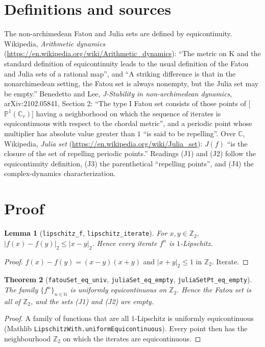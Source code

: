 \documentclass[11pt]{article}
\newtheorem{theorem}{Theorem}
\newtheorem{lemma}[theorem]{Lemma}
\theoremstyle{definition}
\newcommand{\Zt}{\mathbb{Z}_2}
\begin{document}
\section{Definitions and sources}

The non-archimedean Fatou and Julia sets are defined by equicontinuity. Wikipedia,
\emph{Arithmetic dynamics} (\url{https://en.wikipedia.org/wiki/Arithmetic_dynamics}): ``The metric
on K and the standard definition of equicontinuity leads to the usual definition of the Fatou and
Julia sets of a rational map'', and ``A striking difference is that in the nonarchimedean setting,
the Fatou set is always nonempty, but the Julia set may be empty.'' Benedetto and Lee,
\emph{J-Stability in non-archimedean dynamics}, arXiv:2102.05841, Section 2: ``The type I Fatou
set consists of those points of [$\mathbb{P}^1(\mathbb{C}_v)$] having a neighborhood on which the
sequence of iterates is equicontinuous with respect to the chordal metric'', and a periodic point
whose multiplier has absolute value greater than $1$ ``is said to be repelling''. Over
$\mathbb{C}$, Wikipedia, \emph{Julia set} (\url{https://en.wikipedia.org/wiki/Julia_set}): $J(f)$
``is the closure of the set of repelling periodic points.'' Readings (J1) and (J2) follow the
equicontinuity definition, (J3) the parenthetical ``repelling points'', and (J4) the
complex-dynamics characterization.

\section{Proof}

\begin{lemma}[\texttt{lipschitz\_f}, \texttt{lipschitz\_iterate}]
For $x,y\in\Zt$, $|f(x)-f(y)|_2\le|x-y|_2$. Hence every iterate $f^{n}$ is $1$-Lipschitz.
\end{lemma}
\begin{proof}
$f(x)-f(y)=(x-y)(x+y)$ and $|x+y|_2\le 1$ in $\Zt$. Iterate.
\end{proof}

\begin{theorem}[\texttt{fatouSet\_eq\_univ}, \texttt{juliaSet\_eq\_empty}, \texttt{juliaSetPt\_eq\_empty}]
The family $\{f^{n}\}_{n\in\mathbb{N}}$ is uniformly equicontinuous on $\Zt$. Hence the Fatou set
is all of $\Zt$, and the sets (J1) and (J2) are empty.
\end{theorem}
\begin{proof}
A family of functions that are all $1$-Lipschitz is uniformly equicontinuous (Mathlib
\texttt{LipschitzWith.uniformEquicontinuous}). Every point then has the neighbourhood $\Zt$ on
which the iterates are equicontinuous.
\end{proof}
\end{document}
